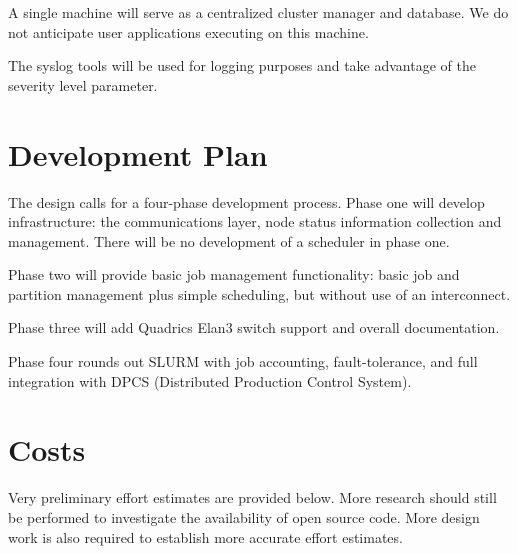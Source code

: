 A single machine will serve as a centralized cluster manager and database. We
do not anticipate user applications executing on this machine. 

The syslog tools will be used for logging purposes and take advantage of the 
severity level parameter.

\section{Development Plan}

The design calls for a four-phase development process.  Phase one will
develop infrastructure: the communications layer, node status information 
collection and management.  There will be no development of a scheduler 
in phase one.

Phase two will provide basic job management functionality:  basic job and 
partition management plus simple scheduling, but without use of an
interconnect. 

Phase three will add Quadrics Elan3 switch support and overall documentation.  

Phase four rounds out SLURM with job accounting, fault-tolerance, 
and full integration with DPCS (Distributed Production Control System).


\section{Costs}

Very preliminary effort estimates are provided below. More research should
still be performed to investigate the availability of open source code. More
design work is also required to establish more accurate effort estimates.

